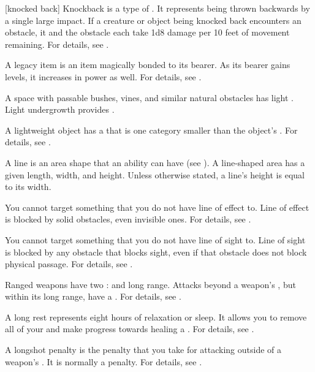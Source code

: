 [knocked back] Knockback is a type of .
It represents being thrown backwards by a single large impact.
If a creature or object being knocked back encounters an obstacle, it and the obstacle each take 1d8 damage per 10 feet of movement remaining.
For details, see .

 A legacy item is an item magically bonded to its bearer.
As its bearer gains levels, it increases in power as well.
For details, see .

 A space with passable bushes, vines, and similar natural obstacles has light .
Light undergrowth provides .

 A lightweight object has a  that is one category smaller than the object's .
For details, see .

 A line is an area shape that an ability can have (see ).
A line-shaped area has a given length, width, and height.
Unless otherwise stated, a line's height is equal to its width.

 You cannot target something that you do not have line of effect to.
Line of effect is blocked by solid obstacles, even invisible ones.
For details, see .

 You cannot target something that you do not have line of sight to.
Line of sight is blocked by any obstacle that blocks sight, even if that obstacle does not block physical passage.
For details, see .

 Ranged weapons have two :  and long range.
Attacks beyond a weapon's , but within its long range, have a  .
For details, see .

 A long rest represents eight hours of relaxation or sleep.
It allows you to remove all of your  and make progress towards healing a .
For details, see .

 A longshot penalty is the penalty that you take for attacking outside of a weapon's .
It is normally a   penalty.
For details, see .

